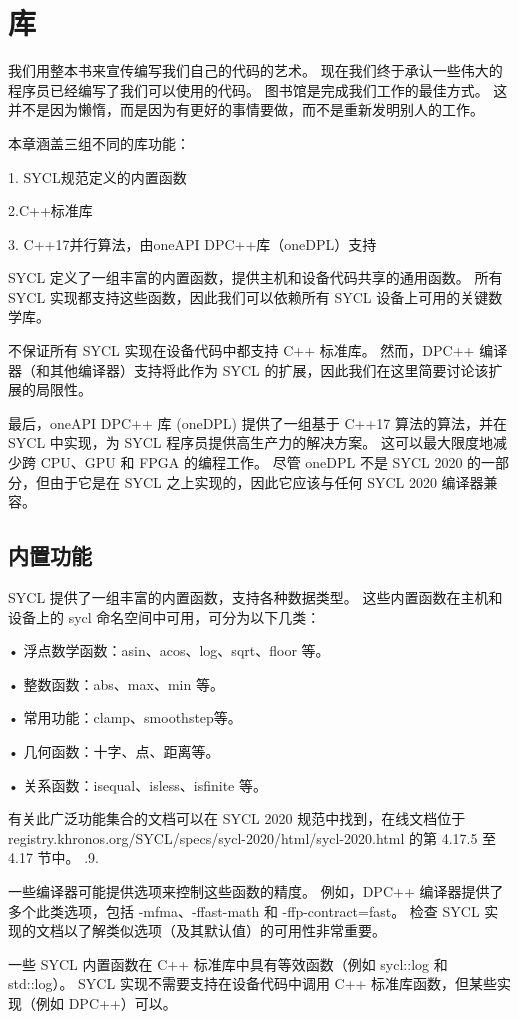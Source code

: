 \section{库}
我们用整本书来宣传编写我们自己的代码的艺术。 现在我们终于承认一些伟大的程序员已经编写了我们可以使用的代码。 图书馆是完成我们工作的最佳方式。 这并不是因为懒惰，而是因为有更好的事情要做，而不是重新发明别人的工作。

本章涵盖三组不同的库功能：

1. SYCL规范定义的内置函数

2.C++标准库

3. C++17并行算法，由oneAPI DPC++库（oneDPL）支持

SYCL 定义了一组丰富的内置函数，提供主机和设备代码共享的通用函数。 所有 SYCL 实现都支持这些函数，因此我们可以依赖所有 SYCL 设备上可用的关键数学库。

不保证所有 SYCL 实现在设备代码中都支持 C++ 标准库。 然而，DPC++ 编译器（和其他编译器）支持将此作为 SYCL 的扩展，因此我们在这里简要讨论该扩展的局限性。

最后，oneAPI DPC++ 库 (oneDPL) 提供了一组基于 C++17 算法的算法，并在 SYCL 中实现，为 SYCL 程序员提供高生产力的解决方案。 这可以最大限度地减少跨 CPU、GPU 和 FPGA 的编程工作。 尽管 oneDPL 不是 SYCL 2020 的一部分，但由于它是在 SYCL 之上实现的，因此它应该与任何 SYCL 2020 编译器兼容。

\subsection{内置功能}
SYCL 提供了一组丰富的内置函数，支持各种数据类型。 这些内置函数在主机和设备上的 sycl 命名空间中可用，可分为以下几类：

• 浮点数学函数：asin、acos、log、sqrt、floor 等。

• 整数函数：abs、max、min 等。

• 常用功能：clamp、smoothstep等。

• 几何函数：十字、点、距离等。

• 关系函数：isequal、isless、isfinite 等。

有关此广泛功能集合的文档可以在 SYCL 2020 规范中找到，在线文档位于registry.khronos.org/SYCL/specs/sycl-2020/html/sycl-2020.html 的第 4.17.5 至 4.17 节中。 .9.

一些编译器可能提供选项来控制这些函数的精度。 例如，DPC++ 编译器提供了多个此类选项，包括 -mfma、-ffast-math 和 -ffp-contract=fast。 检查 SYCL 实现的文档以了解类似选项（及其默认值）的可用性非常重要。

一些 SYCL 内置函数在 C++ 标准库中具有等效函数（例如 sycl::log 和 std::log）。 SYCL 实现不需要支持在设备代码中调用 C++ 标准库函数，但某些实现（例如 DPC++）可以。

